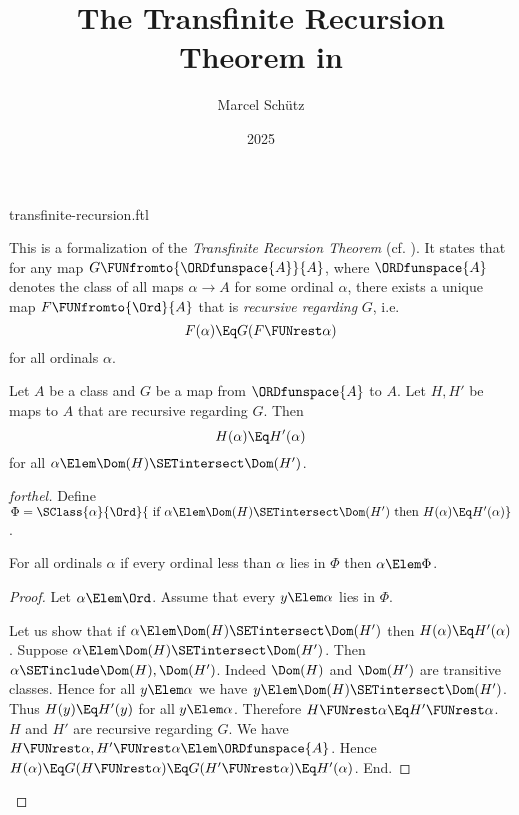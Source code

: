 \documentclass{stex}
\title{The Transfinite Recursion Theorem in \Naproche}
\author{Marcel Schütz}
\date{2025}
\begin{document}
\begin{smodule}{transfinite-recursion.ftl}
\maketitle



\noindent This is a formalization of the \emph{Transfinite Recursion Theorem}
(cf. \cite{Koepke2018}).
It states that for any map $G \FUNfromto{\ORDfunspace{A}}{A}$, where
$\ORDfunspace{A}$ denotes the class of all maps $\alpha \to A$ for some
ordinal $\alpha$, there exists a unique map $F \FUNfromto{\Ord}{A}$ that is
\emph{recursive regarding} $G$, i.e. \[F(\alpha) \Eq G(F \FUNrest \alpha)\] for
all ordinals $\alpha$.

\begin{lemma}[forthel,title=Coincidence Lemma,name=coincidence lemma]
  Let $A$ be a class and $G$ be a map from $\ORDfunspace{A}$ to $A$.
  Let $H, H'$ be maps to $A$ that are recursive regarding $G$.
  Then \[ H(\alpha) \Eq H'(\alpha) \] for all $\alpha \Elem \Dom(H) \SETintersect \Dom(H')$.
\end{lemma}
\begin{proof}[forthel]
  Define $\Phi = \SClass{\alpha}{\Ord}{\text{ if }
  \alpha \Elem \Dom(H) \SETintersect \Dom(H')\text{ then }H(\alpha) \Eq H'(\alpha)}$.

  For all ordinals $\alpha$ if every ordinal less than $\alpha$ lies in $\Phi$ then $\alpha \Elem \Phi$.
  \begin{proof}
    Let $\alpha \Elem \Ord$.
    Assume that every $y \Elem \alpha$ lies in $\Phi$.

    Let us show that if $\alpha \Elem \Dom(H) \SETintersect \Dom(H')$ then
    $H(\alpha) \Eq H'(\alpha)$.
      Suppose $\alpha \Elem \Dom(H) \SETintersect \Dom(H')$.
      Then $\alpha \SETinclude \Dom(H), \Dom(H')$.
      Indeed $\Dom(H)$ and $\Dom(H')$ are transitive classes.
      Hence for all $y \Elem \alpha$ we have $y \Elem \Dom(H) \SETintersect \Dom(H')$.
      Thus $H(y) \Eq H'(y)$ for all $y \Elem \alpha$.
      Therefore $H \FUNrest \alpha \Eq H' \FUNrest \alpha$.
      $H$ and $H'$ are recursive regarding $G$.
      We have $H \FUNrest \alpha, H' \FUNrest \alpha \Elem \ORDfunspace{A}$.
      Hence $H(\alpha)
        \Eq G(H \FUNrest \alpha)
        \Eq G(H' \FUNrest \alpha)
        \Eq H'(\alpha)$.
    End.


\end{proof}
\end{proof}
\end{smodule}
\end{document}

